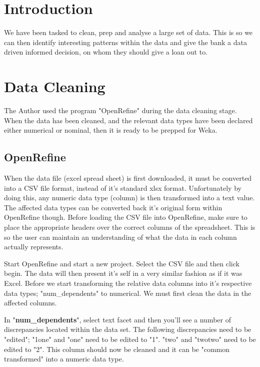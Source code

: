 \documentclass[10pt, a4paper]{article}
\title{\mytitle}
\author{\myauthor\hspace{1em}\\\contact\\Edinburgh Napier University\hspace{0.5em}-\hspace{0.5em}\mymodule}
\date{}
\begin{document}
    \maketitle
    
    \section{Introduction}
    
    We have been tasked to clean, prep and analyse a large set of data. This is so we can then identify interesting patterns within the data and give the bank a data driven informed decision, on whom they should give a loan out to.
    
    \section{Data Cleaning}
    The Author used the program "OpenRefine" during the data cleaning stage. When the data has been cleaned, and the relevant data types have been declared either numerical or nominal, then it is ready to be prepped for Weka.
    
    \subsection{OpenRefine}
    
    When the data file (excel spread sheet) is first downloaded, it must be converted into a CSV file format, instead of it's standard xlsx format. Unfortunately by doing this, any numeric data type (column) is then transformed into a text value. The affected data types can be converted back it's original form within OpenRefine though. Before loading the CSV file into OpenRefine, make sure to place the appropriate headers over the correct columns of the spreadsheet. This is so the user can maintain an understanding of what the data in each column actually represents.
  
    Start OpenRefine and start a new project. Select the CSV file and then click begin. The data will then present it's self in a very similar fashion as if it was Excel. Before we start transforming the relative data columns into it's respective data types; "num\_dependents" to numerical. We must first clean the data in the affected columns.

    In "\textbf{num\_dependents}", select text facet and then you'll see a number of discrepancies located within the data set. The following discrepancies need to be "edited"; "1one" and "one" need to be edited to "1". "two" and "twotwo" need to be edited to "2". This column should now be cleaned and it can be "common transformed" into a numeric data type.
    
\end{document}
